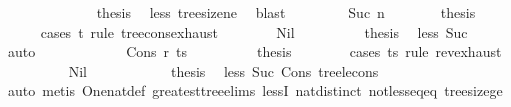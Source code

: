 \begin{isabellebody}
\ \ \ \ \isamarkupfalse%
\ {}\isanewline
\ \ \ \ \isamarkupfalse%
\ \isamarkupfalse%
\ {\isacharquery}{\kern0pt}thesis\ \isamarkupfalse%
\ less\ tree{\isacharunderscore}{\kern0pt}size{\isacharunderscore}{\kern0pt}ne{\isacharunderscore}{\kern0pt}{}\ \isamarkupfalse%
\ blast\isanewline
\ \ \isamarkupfalse%
\isanewline
\ \ \ \ \isamarkupfalse%
\ {\isacharparenleft}{\kern0pt}Suc\ n{\isacharprime}{\kern0pt}{\isacharparenright}{\kern0pt}\isanewline
\ \ \ \ \isamarkupfalse%
\ \isamarkupfalse%
\ {\isacharquery}{\kern0pt}thesis\isanewline
\ \ \ \ \isamarkupfalse%
\ {\isacharparenleft}{\kern0pt}cases\ t\ rule{\isacharcolon}{\kern0pt}\ tree{\isacharunderscore}{\kern0pt}cons{\isacharunderscore}{\kern0pt}exhaust{\isacharparenright}{\kern0pt}\isanewline
\ \ \ \ \ \ \isamarkupfalse%
\ Nil\isanewline
\ \ \ \ \ \ \isamarkupfalse%
\ \isamarkupfalse%
\ {\isacharquery}{\kern0pt}thesis\ \isamarkupfalse%
\ less\ Suc\ \isamarkupfalse%
\ auto\isanewline
\ \ \ \ \isamarkupfalse%
\isanewline
\ \ \ \ \ \ \isamarkupfalse%
\ {\isacharparenleft}{\kern0pt}Cons\ r\ ts{\isacharparenright}{\kern0pt}\isanewline
\ \ \ \ \ \ \isamarkupfalse%
\ \isamarkupfalse%
\ {\isacharquery}{\kern0pt}thesis\isanewline
\ \ \ \ \ \ \isamarkupfalse%
\ {\isacharparenleft}{\kern0pt}cases\ ts\ rule{\isacharcolon}{\kern0pt}\ rev{\isacharunderscore}{\kern0pt}exhaust{\isacharparenright}{\kern0pt}\isanewline
\ \ \ \ \ \ \ \ \isamarkupfalse%
\ Nil\isanewline
\ \ \ \ \ \ \ \ \isamarkupfalse%
\ \isamarkupfalse%
\ {\isacharquery}{\kern0pt}thesis\ \isamarkupfalse%
\ less\ Suc\ Cons\ tree{\isacharunderscore}{\kern0pt}le{\isacharunderscore}{\kern0pt}cons{}\isanewline
\ \ \ \ \ \ \ \ \ \ \isamarkupfalse%
\ {\isacharparenleft}{\kern0pt}auto{\isacharcomma}{\kern0pt}\ metis\ One{\isacharunderscore}{\kern0pt}nat{\isacharunderscore}{\kern0pt}def\ greatest{\isacharunderscore}{\kern0pt}tree{\isachardot}{\kern0pt}elims\ lessI\ nat{\isachardot}{\kern0pt}distinct{\isacharparenleft}{\kern0pt}{}{\isacharparenright}{\kern0pt}\ not{\isacharunderscore}{\kern0pt}less{\isacharunderscore}{\kern0pt}eq{\isacharunderscore}{\kern0pt}eq\ tree{\isacharunderscore}{\kern0pt}size{\isacharunderscore}{\kern0pt}ge{\isacharunderscore}{\kern0pt}{}{\isacharparenright}{\kern0pt}\isanewline

\end{isabellebody}
